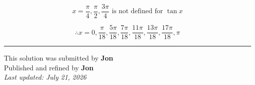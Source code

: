 \documentclass[12pt]{article}
\begin{document}
$$x=\frac{\pi}{4},\frac{\pi}{2},\frac{3\pi}{4}\text{ is not defined for } \tan x$$

$$\therefore x=0,\frac{\pi}{18},\frac{5\pi}{18},\frac{7\pi}{18},\frac{11\pi}{18},\frac{13\pi}{18},\frac{17\pi}{18},\pi$$

\bigskip
\hrule
\begin{center}
    This solution was submitted by \textbf{Jon}\\[4pt]
    Published and refined by \textbf{Jon}\\[8pt]
    \textit{Last updated: July 21, 2026}
\end{center}
\end{document}
